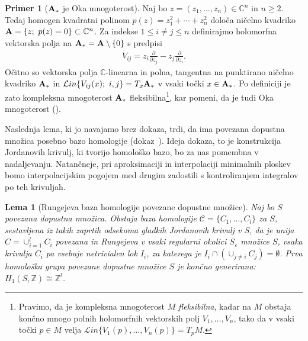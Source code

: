 \documentclass[12pt,a4paper,twoside]{article}
\theoremstyle{definition} %
\newtheorem{primer}[definicija]{Primer}
\theoremstyle{plain} %
\newtheorem{lema}[definicija]{Lema}
\numberwithin{equation}{section}  %
\begin{document}
\begin{primer} [$\textbf{\textup{A}}_{*}$ je Oka mnogoterost] \label{primer-oka}
Naj bo $z = (z_{1}, \dots , z_{n}) \in \mathbb{C}^{n}$ in $n \geq 2$. Tedaj  homogen kvadratni polinom $p(z) = z_{1}^{2} + \cdots + z_{n}^{2}$ določa ničelno kvadriko $\textbf{\textup{A}} = \{z ; \ p(z)=0 \} \subset \mathbb{C}^{n}$.
Za indekse $1 \leq i \neq j \leq n$ definirajmo holomorfna vektorska polja na $ \textbf{\textup{A}}_{*} = \textbf{\textup{A}} \setminus \{ 0 \}$ s predpisi
\begin{gather*}
V_{ij} = z_{i} \frac{\partial}{\partial z_{j}} - z_{j} \frac{\partial}{\partial z_{i}}.
\end{gather*}
Očitno so vektorska polja $\mathbb{C}$-linearna in polna, tangentna na punktirano ničelno kvadriko $\textbf{\textup{A}}_{*}$ in $\mathcal{L}in \{ V_{ij}(x) ; \ i,j \} = T_{x}\textbf{\textup{A}}_{*}$ v vsaki točki $x \in \textbf{\textup{A}}_{*}$. Po definiciji je zato kompleksna mnogoterost $\textbf{\textup{A}}_{*}$ fleksibilna\footnote{Pravimo, da je kompleksna mnogoterost $M$ \emph{fleksibilna}, kadar na $M$ obstaja končno mnogo polnih holomorfnih vektorskih polj $V_{1}, \dots , V_{n}$, tako da v vsaki točki $p \in M$ velja $\mathcal{L}in \{ V_{1}(p), \dots , V_{n}(p) \} = T_{p}M$.}, 
kar pomeni, da je tudi Oka mnogoterost (\cite[Definition~1.13.7]{alarcon2021minimal}).
\end{primer}

Naslednja lema, ki jo navajamo brez dokaza, trdi, da ima povezana dopustna množica posebno bazo homologije (dokaz~\cite[str.~69--71]{alarcon2021minimal}). Ideja dokaza, to je konstrukcija Jordanovih krivulj, ki tvorijo homološko bazo, bo za nas pomembna v nadaljevanju. Natančneje, pri aproksimaciji in interpolaciji minimalnih ploskev bomo interpolacijskim pogojem med drugim zadostili s kontroliranjem integralov po teh krivuljah.

\begin{lema} [Rungejeva baza homologije povezane dopustne množice] \label{lema:Runge-hom-baza}
Naj bo $S$ povezana dopustna množica. Obstaja baza homologije $\mathcal{C} = \{ C_{1}, \dots , C_{l} \}$ za $S$, sestavljena iz takih zaprtih odsekoma gladkih Jordanovih krivulj v $S$, da je unija $C = \cup_{i=1}^{l} C_{i}$ povezana in Rungejeva v vsaki regularni okolici $S_{\varepsilon}$ množice $S$, vsaka krivulja $C_{i}$ pa vsebuje netrivialen lok $I_{i}$, za katerega je $I_{i} \cap (\cup_{j \neq i} C_{j}) = \emptyset$.
Prva homološka grupa povezane dopustne množice $S$ je končno generirana: $H_{1}(S, \mathbb{Z}) \cong \mathbb{Z}^{l}$.
\end{lema}
\end{document}
